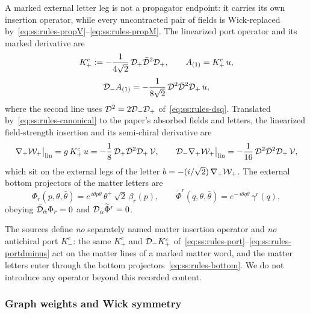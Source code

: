 A marked external letter leg is not a propagator endpoint: it carries its own insertion operator, while every uncontracted pair of fields is Wick-replaced by~\eqref{eq:ss:rules-propV}--\eqref{eq:ss:rules-propM}. The linearized port operator and its marked derivative are
\begin{equation}\label{eq:ss:rules-port}
K_{+}^{c}:=-\frac{1}{4\sqrt2}\,\mathcal{D}_{+}\bar{\mathcal{D}}^{2}\mathcal{D}_{+},
\qquad
A_{(1)}=K_{+}^{c}\,u ,
\end{equation}
\begin{equation}\label{eq:ss:rules-portdminus}
\mathcal{D}_{-}A_{(1)}
=-\frac{1}{8\sqrt2}\,\mathcal{D}^{2}\bar{\mathcal{D}}^{2}\mathcal{D}_{+}\,u ,
\end{equation}
where the second line uses $\mathcal{D}^{2}=2\mathcal{D}_{-}\mathcal{D}_{+}$ of~\eqref{eq:ss:rules-dsq}. Translated by~\eqref{eq:ss:rules-canonical} to the paper's absorbed fields and letters, the linearized field-strength insertion and its semi-chiral derivative are
\begin{equation}\label{eq:ss:rules-portV}
\nabla_{+}\mathcal{W}_{+}\big|_{\mathrm{lin}}
=g\,K_{+}^{c}\,u
=-\frac{1}{8}\,\mathcal{D}_{+}\bar{\mathcal{D}}^{2}\mathcal{D}_{+}\,\mathcal{V} ,
\qquad
\mathcal{D}_{-}\nabla_{+}\mathcal{W}_{+}\big|_{\mathrm{lin}}
=-\frac{1}{16}\,\mathcal{D}^{2}\bar{\mathcal{D}}^{2}\mathcal{D}_{+}\,\mathcal{V} ,
\end{equation}
which sit on the external legs of the letter $b=-(i/\sqrt2)\,\nabla_{+}\mathcal{W}_{+}$. The external bottom projectors of the matter letters are
\begin{equation}\label{eq:ss:rules-bottom}
\Phi_{r}(p,\theta,\bar\theta)
=e^{\,i\theta p\bar\theta}\,\theta^{+}\,\sqrt2\,\beta_{r}(p),
\qquad
\widetilde\Phi^{r}(q,\theta,\bar\theta)
=e^{-\,i\theta q\bar\theta}\,\gamma^{r}(q) ,
\end{equation}
obeying $\bar{\mathcal{D}}_{\dot\alpha}\Phi_{r}=0$ and $\mathcal{D}_{\alpha}\widetilde\Phi^{r}=0$.

\begin{remark}%
\label{rem:ss:rules-matterport}
The sources define \emph{no} separately named matter insertion operator and \emph{no} antichiral port $K_{-}^{c}$: the same $K_{+}^{c}$ and $\mathcal{D}_{-}K_{+}^{c}$ of~\eqref{eq:ss:rules-port}--\eqref{eq:ss:rules-portdminus} act on the matter lines of a marked matter word, and the matter letters enter through the bottom projectors~\eqref{eq:ss:rules-bottom}. We do not introduce any operator beyond this recorded content.
\end{remark}

\subsubsection*{Graph weights and Wick symmetry}

